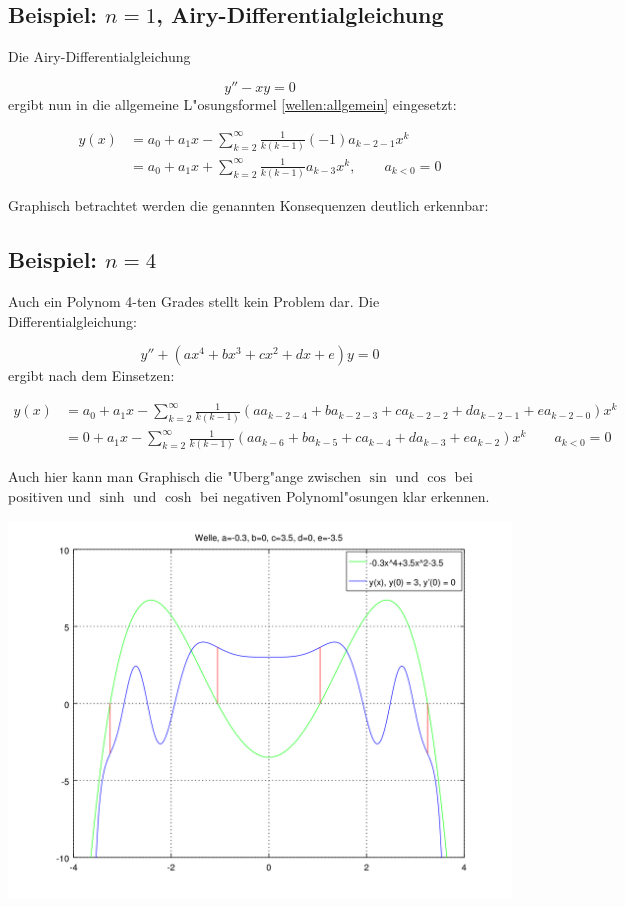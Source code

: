 \subsection{Beispiel: $n = 1$, Airy-Differentialgleichung}
Die Airy-Differentialgleichung

\begin{equation*}
	y''-xy = 0
\end{equation*}
ergibt nun in die allgemeine L"osungsformel \ref{wellen:allgemein} eingesetzt:

\begin{equation*}
\begin{split}
	y(x) &= a_0+a_1x-\sum_{k=2}^{\infty} \frac{1}{k(k-1)} (-1) a_{k-2-1} x^k
	\\
	&= a_0+a_1x+\sum_{k=2}^{\infty} \frac{1}{k(k-1)} a_{k-3} x^k,
	\qquad a_{k < 0} = 0
\end{split}
\end{equation*}

Graphisch betrachtet werden die genannten Konsequenzen deutlich erkennbar:


\subsection{Beispiel: $n = 4$}

Auch ein Polynom 4-ten Grades stellt kein Problem dar. Die 
Differentialgleichung:

\begin{equation*}
	y''+(ax^4+bx^3+cx^2+dx+e)y = 0
\end{equation*}
ergibt nach dem Einsetzen:

\begin{equation*}
\begin{split}
	y(x) &= a_0+a_1x-\sum_{k=2}^{\infty} \frac{1}{k(k-1)} (aa_{k-2-4} + 
	ba_{k-2-3} + ca_{k-2-2} + da_{k-2-1} +ea_{k-2-0})x^k
	\\
	&= 0+a_1x-\sum_{k=2}^{\infty} \frac{1}{k(k-1)} (aa_{k-6} + ba_{k-5} + 
	ca_{k-4} + da_{k-3} +ea_{k-2})x^k \qquad a_{k<0} = 0
\end{split}
\end{equation*}

Auch hier kann man Graphisch die "Uberg"ange zwischen $\sin$ und $\cos$ bei 
positiven und $\sinh$ und $\cosh$ bei negativen Polynoml"osungen klar erkennen.

\begin{center}
	\includegraphics[scale=0.7]{./wellen/images/allgemein/wave.png}
\end{center}